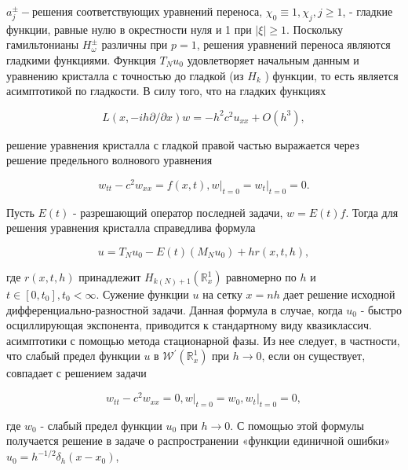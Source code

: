 \documentclass[10pt]{article}
\begin{document}
$a_{j}^{ \pm}-$решения соответствующих уравнений переноса, $\chi_{0} \equiv 1, \chi_{j}, j \geqslant 1$, - гладкие функции, равные нулю в окрестности нуля и 1 при $|\xi| \geqslant 1$. Поскольку гамильтонианы $H_{\omega}^{ \pm}$ различны при $p=1$, решения уравнений переноса являются гладкими функциями. Функция $T_{N} u_{0}$ удовлетворяет начальным данным и уравнению кристалла с точностью до гладкой (из $H_{k}$ ) функции, то есть является асимптотикой по гладкости. В силу того, что на гладких функциях



\[

L(x,-i h \partial / \partial x) w=-h^{2} c^{2} u_{x x}+O\left(h^{3}\right),

\]



решение уравнения кристалла с гладкой правой частью выражается через решение предельного волнового уравнения



\[

w_{t t}-c^{2} w_{x x}=f(x, t),\left.w\right|_{t=0}=\left.w_{t}\right|_{t=0}=0 .

\]



Пусть $E(t)$ - разрешающий оператор последней задачи, $w=E(t) f$. Тогда для решения уравнения кристалла справедлива формула



\[

u=T_{N} u_{0}-E(t)\left(M_{N} u_{0}\right)+h r(x, t, h),

\]



где $r(x, t, h)$ принадлежит $H_{k(N)+1}\left(\mathbb{R}_{x}^{1}\right)$ равномерно по $h$ и $t \in\left[0, t_{0}\right], t_{0}<\infty$. Сужение функции $u$ на сетку $x=n h$ дает решение исходной дифференциально-разностной задачи. Данная формула в случае, когда $u_{0}$ - быстро осциллирующая экспонента, приводится к стандартному виду квазиклассич. асимптотики с помощью метода стационарной фазы. Из нее следует, в частности, что слабый предел функции $u$ в $\mathscr{W}^{\prime}\left(\mathbb{R}_{x}^{1}\right)$ при $h \rightarrow 0$, если он существует, совпадает с решением задачи



\[

w_{t t}-c^{2} w_{x x}=0,\left.w\right|_{t=0}=w_{0},\left.w_{t}\right|_{t=0}=0,

\]



где $w_{0}$ - слабый предел функции $u_{0}$ при $h \rightarrow 0$. С помощью этой формулы получается решение в задаче о распространении «функции единичной ошибки» $u_{0}=h^{-1 / 2} \delta_{h}\left(x-x_{0}\right)$,
\end{document}
